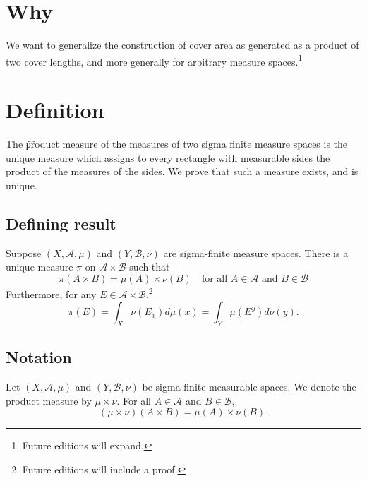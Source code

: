 
\section*{Why}

We want to generalize the construction of cover area as generated as a product of two cover lengths, and more generally for arbitrary measure spaces.\footnote{Future editions will expand.}

\section*{Definition}

The
\t{product measure}
of the measures of two
sigma finite measure spaces
is the unique measure
which assigns to every
rectangle with measurable
sides the product
of the measures of the sides.
We prove that such a measure exists,
and is unique.

\subsection*{Defining result}

\begin{proposition}
Suppose $(X, \mathcal{A} , \mu )$ and $(Y, \mathcal{B} , \nu )$ are sigma-finite measure spaces.
There is a unique measure $\pi $ on $\mathcal{A}  \times \mathcal{B} $ such that
\[
\pi (A \times  B) = \mu (A) \times  \nu (B) \quad \text{for all } A \in \mathcal{A}  \text{ and } B \in \mathcal{B}
\]
Furthermore, for any $E \in \mathcal{A}  \times  \mathcal{B} $.\footnote{Future editions will include a proof.}
\[
\pi (E) = \int _{X} \nu (E_x) d\mu (x) = \int _{Y} \mu (E^y)d\nu (y).
\]
\end{proposition}

\subsection*{Notation}

Let $(X, \mathcal{A} , \mu )$ and $(Y, \mathcal{B} , \nu )$ be sigma-finite measurable spaces.
We denote the product measure by $\mu  \times  \nu $.
For all $A \in \mathcal{A} $ and $B \in \mathcal{B} $,
\[
(\mu  \times  \nu )(A \times  B) = \mu (A) \times  \nu (B).
\]

